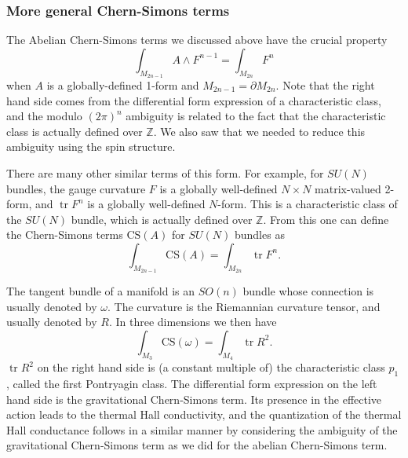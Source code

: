 \documentclass[12pt]{article}
\numberwithin{equation}{section}
\numberwithin{figure}{section}
\theoremstyle{remark}
\def\bZ{\mathbb{Z}}
\def\tr{\mathop{\mathrm{tr}}\nolimits}
\begin{document}
\subsubsection{More general Chern-Simons terms}
\label{sec:gravCS}
The Abelian Chern-Simons terms we discussed above have the crucial property
\begin{equation}
\int_{M_{2n-1}} A\wedge F^{n-1} = \int_{M_{2n}} F^n
\end{equation} when $A$ is a globally-defined 1-form
and $M_{2n-1}=\partial M_{2n}$.
Note that the right hand side comes from the differential form expression
of a characteristic class,
and the modulo $(2\pi)^n$ ambiguity is related to the fact that 
the characteristic class is actually defined over $\bZ$. 
We also saw that we needed to reduce this ambiguity using the spin structure.

There are many other similar terms of this form.
For example, for $SU(N)$ bundles, 
the gauge curvature $F$ is a globally well-defined $N\times N$ matrix-valued 2-form,
and $\tr F^n$ is a globally well-defined $N$-form.
This is a characteristic class of the $SU(N)$ bundle,
which is actually defined over $\bZ$.
From this one can define the Chern-Simons terms $\mathrm{CS}(A)$ for $SU(N)$ bundles
as \begin{equation}
\int_{M_{2n-1}} \mathrm{CS}(A) = \int_{M_{2n}} \tr F^{n}.
\end{equation}

The tangent bundle of a manifold is an $SO(n)$ bundle
whose connection is usually denoted by $\omega$.
The curvature is the Riemannian curvature tensor, and usually denoted by $R$.
In three dimensions we then have \begin{equation}
\int_{M_3} \mathrm{CS}(\omega) = \int_{M_4} \tr R^2.
\end{equation}
$\tr R^2$ on the right hand side is (a constant multiple of)
the characteristic class $p_1$, called the first Pontryagin class.
The differential form expression on the left hand side is the gravitational Chern-Simons term.
Its presence in the effective action leads to the thermal Hall conductivity,
and the quantization of the thermal Hall conductance
follows in a similar manner 
by considering the ambiguity of the gravitational Chern-Simons term 
as we did for the abelian Chern-Simons term.
\end{document}
